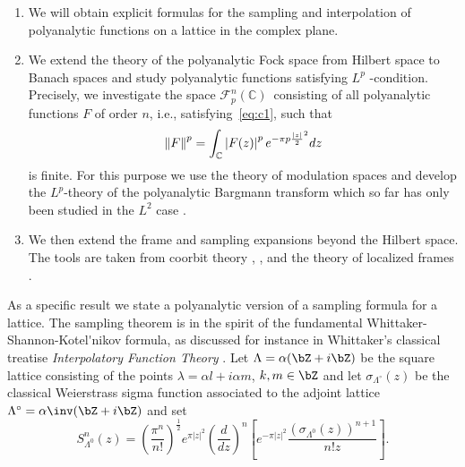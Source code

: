 \documentclass[12pt]{amsart}
\theoremstyle{plain}
\numberwithin{equation}{section}
\begin{document}
\begin{enumerate}
\item We will obtain explicit formulas for the sampling and interpolation of
polyanalytic functions on a lattice in the complex plane.

\item We extend the theory of the polyanalytic Fock space from Hilbert space
to Banach spaces and study polyanalytic functions satisfying $L^{p}$%
-condition. Precisely, we investigate the space $\mathcal{F}_{p}^{n}(%
\mathbb{C}
)$\ consisting of all polyanalytic functions $F$ of order $n$, i.e.,
satisfying~\eqref{eq:c1}, such that 
\begin{equation*}
\left\Vert F\right\Vert ^{p}=\int_{%
\mathbb{C}
}\left\vert F(z)\right\vert ^{p}e^{-\pi p\frac{\left\vert z\right\vert }{2}%
^{2}}dz
\end{equation*}%
is finite. For this purpose we use the theory of modulation spaces \cite%
{FeiModulation} and develop the $L^{p}$-theory of the polyanalytic Bargmann
transform which so far has only been studied in the $L^{2}$ case \cite%
{Abreusampling}.

\item We then extend the frame and sampling expansions beyond the Hilbert
space. The tools are taken from coorbit theory \cite{FG0}, \cite{FG}, \cite%
{atomGroch} and the theory of localized frames \cite{Localization_one}.
\end{enumerate}

As a specific result we state a polyanalytic version of a sampling formula
for a lattice. The sampling theorem is in the spirit of the fundamental
Whittaker-Shannon-Kotel\'{}nikov formula, as discussed for instance in
Whittaker's classical treatise \emph{Interpolatory Function Theory }\cite{W}%
. Let $\Lambda =\alpha (\bZ+i\bZ)$ be the square lattice consisting of the
points $\lambda =\alpha l+i\alpha m$, $k,m\in \bZ$ and let $\sigma _{\Lambda
^{\circ }}(z)$ be the classical Weierstrass sigma function associated to the
adjoint lattice $\Lambda ^{\circ }=\alpha \inv(\bZ+i\bZ)$ and set 
\begin{equation*}
S_{\Lambda ^{0}}^{n}(z)=\left( \frac{\pi ^{n}}{n!}\right) ^{\frac{1}{2}%
}e^{\pi \left\vert z\right\vert ^{2}}\left( \frac{d}{dz}\right) ^{n}\left[
e^{-\pi \left\vert z\right\vert ^{2}}\frac{\left( \sigma _{\Lambda
^{0}}(z)\right) ^{n+1}}{n!z}\right] .
\end{equation*}%
%
%
%
%
%
\end{document}
